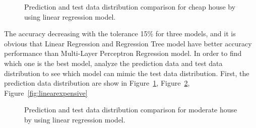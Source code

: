 \documentclass[11pt,a4paper]{article}
\begin{document}
\begin{figure}[h]
    \centering
    \hfill%
    \caption{Prediction and test data distribution comparison for cheap house by using linear regression model.}
    \label{fig:linearcheap}
\end{figure}

The accuracy decreasing with the tolerance 15\% for three models, and it is obvious that Linear Regression and Regression Tree model have better accuracy performance than Multi-Layer Perceptron Regression model. In order to find which one is the best model, analyze the prediction data and test data distribution to see which model can mimic the test data distribution. First, the prediction data distribution are show in Figure~\ref{fig:linearcheap}, Figure~\ref{fig:linearmoderate}, Figure~\ref{fig:linearexpensive}

\begin{figure}[h]
    \centering
    \hfill%
    \caption{Prediction and test data distribution comparison for moderate house by using linear regression model.}
    \label{fig:linearmoderate}
\end{figure}
\end{document}
